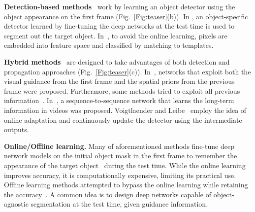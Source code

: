 \documentclass[10pt,twocolumn,letterpaper]{article}
\newcommand{\fref}[1]{Fig.~\ref{#1}}
\renewcommand{\paragraph}[1]{\vspace{1mm}\noindent\textbf{#1}}
\begin{document}
\paragraph{Detection-based methods}~\cite{caelles2017one, maninis2017video, yoon2017pixel, bao2018cnn, chen2018blazingly, hu2018videomatch} work by learning an object detector using the object appearance on the first frame (\fref{Fig:teaser}(b)).
In \cite{caelles2017one, maninis2017video}, an object-specific detector learned by fine-tuning the deep networks at the test time is used to segment out the target object. 
In~\cite{chen2018blazingly, hu2018videomatch}, to avoid the online learning, pixels are embedded into feature space and classified by matching to templates.


\paragraph{Hybrid methods}~\cite{yang2018efficient, oh2018fast} are designed to take advantages of both detection and propagation approaches (\fref{Fig:teaser}(c)).
In~\cite{oh2018fast,yang2018efficient}, networks that exploit both the visual guidance from the first frame and the spatial priors from the previous frame were proposed.
Furthermore, some methods tried to exploit all previous information~\cite{xu2018youtube, voigtlaender2017online}. 
In~\cite{xu2018youtube}, a sequence-to-sequence network that learns the long-term information in videos was proposed.
Voigtlaender and Leibe~\cite{voigtlaender2017online} employ the idea of online adaptation and continuously update the detector using the intermediate outputs.

\paragraph{Online/Offline learning.} 
Many of aforementioned methods fine-tune deep network models on the initial object mask in the first frame to remember the appearance of the target object~\cite{caelles2017one,voigtlaender2017online,perazzi2017learning, khoreva2017lucid, perazzi2017learning, hu2017maskrnn, li2018video} during the test time. 
While the online learning improves accuracy, it is computationally expensive, limiting its practical use.
Offline learning methods attempted to bypass the online learning while retaining the accuracy~\cite{oh2018fast, yang2018efficient, chen2018blazingly, hu2018videomatch, joakim2018generative, rvos2019, feelvos2019}. 
A common idea is to design deep networks capable of object-agnostic segmentation at the test time, given guidance information.  
\end{document}
